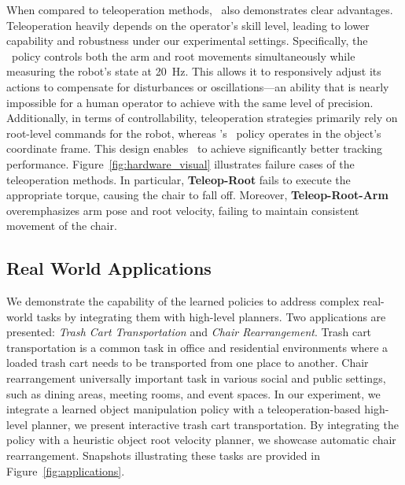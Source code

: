 When compared to teleoperation methods, \method \ also demonstrates clear advantages. Teleoperation heavily depends on the operator's skill level, leading to lower capability and robustness under our experimental settings. Specifically, the \method \ policy controls both the arm and root movements simultaneously while measuring the robot's state at 20~Hz. This allows it to responsively adjust its actions to compensate for disturbances or oscillations—an ability that is nearly impossible for a human operator to achieve with the same level of precision. Additionally, in terms of controllability, teleoperation strategies primarily rely on root-level commands for the robot, whereas \method’s \ policy operates in the object’s coordinate frame. This design enables \method \ to achieve significantly better tracking performance. Figure~\ref{fig:hardware_visual} illustrates failure cases of the teleoperation methods. In particular, \textbf{Teleop-Root} fails to execute the appropriate torque, causing the chair to fall off. Moreover, \textbf{Teleop-Root-Arm} overemphasizes arm pose and root velocity, failing to maintain consistent movement of the chair.





\subsection{Real World Applications}

\label{sec:applications}



We demonstrate the capability of the learned policies to address complex real-world tasks by integrating them with high-level planners. Two applications are presented: \textit{Trash Cart Transportation} and \textit{Chair Rearrangement}. Trash cart transportation is a common task in office and residential environments where a loaded trash cart needs to be transported from one place to another. Chair rearrangement universally important task in various social and public settings, such as dining areas, meeting rooms, and event spaces. In our experiment, we integrate a learned object manipulation policy with a teleoperation-based high-level planner, we present interactive trash cart transportation. By integrating the policy with a heuristic object root velocity planner, we showcase automatic chair rearrangement. 
Snapshots illustrating these tasks are provided in Figure~\ref{fig:applications}.


